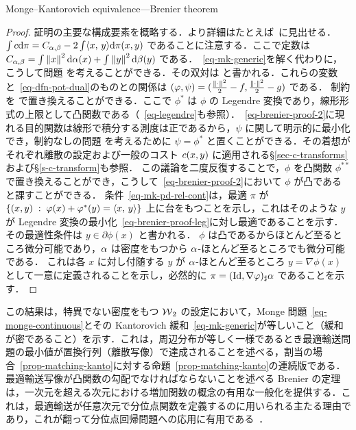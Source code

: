 \begin{rem2}{Monge--Kantorovich equivalence---Brenier theorem}
\begin{proof}
	証明の主要な構成要素を概略する．より詳細はたとえば~\citep{SantambrogioBook}に見出せる．
	$\int c \mathrm{d}\pi = C_{\alpha,\beta} - 2 \int \langle x,\,y\rangle\mathrm{d}\pi(x,y)$ であることに注意する．ここで定数は $C_{\alpha,\beta} = \int \left\| x \right\|^2\mathrm{d}\alpha(x) + \int \left\| y \right\|^2\mathrm{d}\beta(y)$ である．~\eqref{eq-mk-generic}を解く代わりに，こうして問題
	を考えることができる．その双対は
	と書かれる．これらの変数と~\eqref{eq-dfn-pot-dual}のものとの関係は $(\varphi,\psi) = (\frac{\left\| \cdot \right\|^2}{2}-f,\frac{\left\| \cdot \right\|^2}{2}-g)$ である．
	制約を
	で置き換えることができる．ここで $\phi^*$ は $\phi$ の Legendre 変換であり，線形形式の上限として凸関数である（~\eqref{eq-legendre}も参照）．~\eqref{eq-brenier-proof-2}に現れる目的関数は線形で積分する測度は正であるから，$\psi$ に関して明示的に最小化でき，制約なしの問題
	\eql{\label{eq-brenier-proof-2}
		\umin{\phi} \int_\X \phi \d\al + \int_\Y \phi^* \d\be;
	}
	を考えるために $\psi=\phi^*$ と置くことができる．その着想がそれぞれ離散の設定および一般のコスト $c(x,y)$ に適用される\S\ref{sec-c-transforms}および\S\ref{s-c-transform}も参照．
	この議論を二度反復することで，$\phi$ を凸関数 $\phi^{**}$ で置き換えることができ，こうして~\eqref{eq-brenier-proof-2}において $\phi$ が凸であると課すことができる．
	条件~\eqref{eq-mk-pd-rel-cont}は，最適 $\pi$ が $\left\{ (x,y) \;:\; \varphi(x)+\varphi^*(y)=\langle x,\,y\rangle \right\}$ 上に台をもつことを示し，これはそのような $y$ が Legendre 変換の最小化~\eqref{eq-brenier-proof-leg}に対し最適であることを示す．その最適性条件は $y \in \partial \phi(x)$ と書かれる．
	$\phi$ は凸であるからほとんど至るところ微分可能であり，$\alpha$ は密度をもつから $\alpha$-ほとんど至るところでも微分可能である．
	これは各 $x$ に対し付随する $y$ が $\alpha$-ほとんど至るところ $y = \nabla\phi(x)$ として一意に定義されることを示し，必然的に $\pi = (\mathrm{Id},\nabla\varphi)_\sharp \alpha$ であることを示す．
\end{proof}

この結果は，特異でない密度をもつ $\operatorname{\mathcal{W}}_2$ の設定において，Monge 問題~\eqref{eq-monge-continuous}とその Kantorovich 緩和~\eqref{eq-mk-generic}が等しいこと（緩和が密であること）を示す．これは，周辺分布が等しく一様であるとき最適輸送問題の最小値が置換行列（離散写像）で達成されることを述べる，割当の場合~\eqref{prop-matching-kanto}に対する命題~\ref{prop-matching-kanto}の連続版である．
%
最適輸送写像が凸関数の勾配でなければならないことを述べる Brenier の定理は，一次元を超える次元における増加関数の概念の有用な一般化を提供する．これは，最適輸送が任意次元で分位点関数を定義するのに用いられる主たる理由であり，これが翻って分位点回帰問題への応用に有用である~\citep{carlier2016vector}．


\end{rem2}
